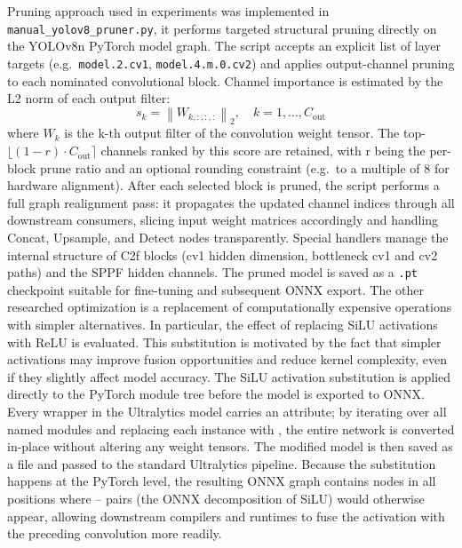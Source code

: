 \documentclass[12pt,a4paper]{report}
\begin{document}
Pruning approach used in experiments was implemented in \texttt{manual\_yolov8\_pruner.py}, it performs targeted
structural pruning directly on the YOLOv8n PyTorch model graph.
The script accepts an explicit list of layer targets (e.g.\ \texttt{model.2.cv1},
\texttt{model.4.m.0.cv2}) and applies output-channel pruning to each nominated convolutional block.
Channel importance is estimated by the L2 norm of each output filter:
\begin{equation}
s_k = \left\lVert W_{k,:,:,:} \right\rVert_2, \quad k = 1, \ldots, C_{\mathrm{out}}
\end{equation}
where $W_k$ is the k-th output filter of the convolution weight tensor.
The top- $\lfloor(1-r)\cdot C_{\mathrm{out}}\rceil$ channels ranked by this score are retained, with
r being the per-block prune ratio and an optional rounding constraint (e.g.\ to a multiple of 8
for hardware alignment).
After each selected block is pruned, the script performs a full graph realignment pass: it propagates
the updated channel indices through all downstream consumers, slicing input weight matrices accordingly
and handling Concat, Upsample, and Detect nodes transparently.
Special handlers manage the internal structure of C2f blocks (cv1 hidden dimension, bottleneck cv1 and
cv2 paths) and the SPPF hidden channels.
The pruned model is saved as a \texttt{.pt} checkpoint suitable for fine-tuning and subsequent ONNX
export.
The other researched optimization is a replacement of computationally expensive operations with simpler alternatives.
In particular, the effect of replacing SiLU activations with ReLU is evaluated. This substitution is motivated by the
fact that simpler activations may improve fusion opportunities and reduce kernel complexity, even if they slightly
affect model accuracy. The SiLU activation substitution is applied directly to the PyTorch module tree before the model is
exported to ONNX.
Every  wrapper in the Ultralytics model carries an  attribute; by iterating
over all named modules and replacing each  instance with , the
entire network is converted in-place without altering any weight tensors.
The modified model is then saved as a  file and passed to the standard Ultralytics
 pipeline.
Because the substitution happens at the PyTorch level, the resulting ONNX graph contains 
nodes in all positions where – pairs (the ONNX decomposition of SiLU) would
otherwise appear, allowing downstream compilers and runtimes to fuse the activation with the preceding
convolution more readily.
\end{document}
